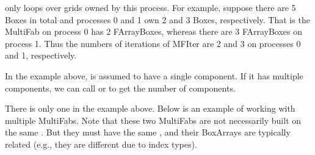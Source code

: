 \documentclass[letterpaper,10pt,english]{sphinxmanual}
\begin{document}
\begin{sphinxVerbatim}[commandchars=\\\{\}]
       
       
       
                
                
                
           
\end{sphinxVerbatim}

\sphinxAtStartPar
{} only loops over grids owned by this process. For example, suppose
there are 5 Boxes in total and processes 0 and 1 own 2 and 3 Boxes,
respectively. That is the MultiFab on process 0 has 2 FArrayBoxes, whereas
there are 3 FArrayBoxes on process 1. Thus the numbers of iterations of MFIter
are 2 and 3 on processes 0 and 1, respectively.

\sphinxAtStartPar
In the example above,  is assumed to have a single
component. If it has multiple components, we can call  or  to get the number of components.

\sphinxAtStartPar
There is only one  in the example above. Below is an example of
working with multiple MultiFabs. Note that these two MultiFabs are not
necessarily built on the same .  But they must have the same
, and their BoxArrays are typically related (e.g.,
they are different due to index types).
\end{document}
